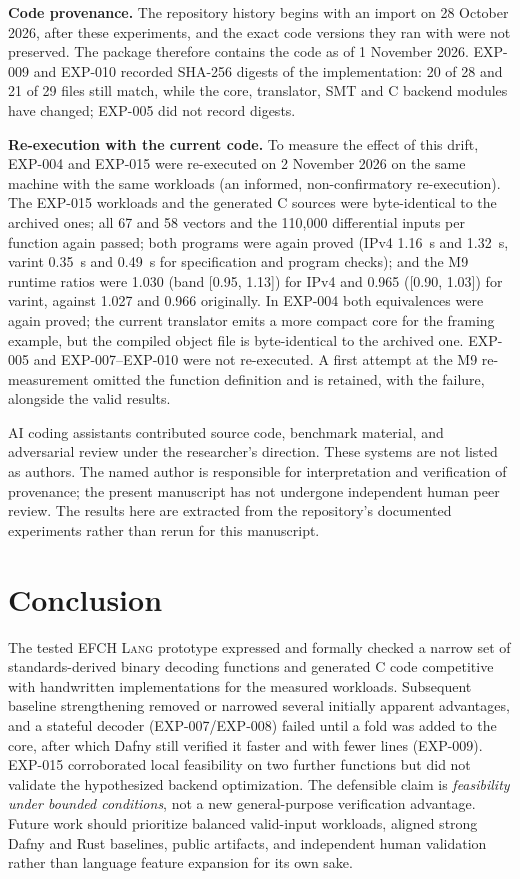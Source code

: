 \documentclass[10pt,twocolumn]{article}
\newcommand{\efch}{\textsc{EFCH Lang}}
\begin{document}
\textbf{Code provenance.} The repository history begins with an import on 28 October 2026, after these experiments, and the exact code versions they ran with were not preserved. The package therefore contains the code as of 1 November 2026. EXP-009 and EXP-010 recorded SHA-256 digests of the implementation: 20 of 28 and 21 of 29 files still match, while the core, translator, SMT and C backend modules have changed; EXP-005 did not record digests.

\textbf{Re-execution with the current code.} To measure the effect of this drift, EXP-004 and EXP-015 were re-executed on 2 November 2026 on the same machine with the same workloads (an informed, non-confirmatory re-execution). The EXP-015 workloads and the generated C sources were byte-identical to the archived ones; all 67 and 58 vectors and the 110,000 differential inputs per function again passed; both programs were again proved (IPv4 1.16~s and 1.32~s, varint 0.35~s and 0.49~s for specification and program checks); and the M9 runtime ratios were 1.030 (band [0.95, 1.13]) for IPv4 and 0.965 ([0.90, 1.03]) for varint, against 1.027 and 0.966 originally. In EXP-004 both equivalences were again proved; the current translator emits a more compact core for the framing example, but the compiled object file is byte-identical to the archived one. EXP-005 and EXP-007--EXP-010 were not re-executed. A first attempt at the M9 re-measurement omitted the function definition and is retained, with the failure, alongside the valid results.

AI coding assistants contributed source code, benchmark material, and adversarial review under the researcher's direction. These systems are not listed as authors. The named author is responsible for interpretation and verification of provenance; the present manuscript has not undergone independent human peer review. The results here are extracted from the repository's documented experiments rather than rerun for this manuscript.

\section{Conclusion}
The tested \efch{} prototype expressed and formally checked a narrow set of standards-derived binary decoding functions and generated C code competitive with handwritten implementations for the measured workloads. Subsequent baseline strengthening removed or narrowed several initially apparent advantages, and a stateful decoder (EXP-007/EXP-008) failed until a fold was added to the core, after which Dafny still verified it faster and with fewer lines (EXP-009). EXP-015 corroborated local feasibility on two further functions but did not validate the hypothesized backend optimization. The defensible claim is \emph{feasibility under bounded conditions}, not a new general-purpose verification advantage. Future work should prioritize balanced valid-input workloads, aligned strong Dafny and Rust baselines, public artifacts, and independent human validation rather than language feature expansion for its own sake.
\end{document}
